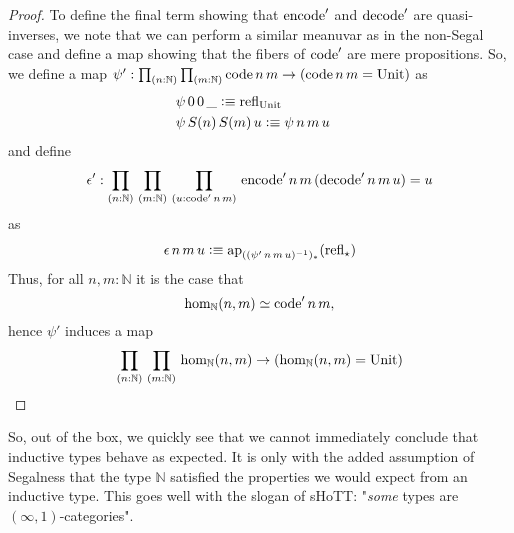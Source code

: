 \documentclass[main.tex]{subfiles}
\begin{document}
\begin{proof}
    To define the final term showing that $\eco'$ and $\dco'$ are quasi-inverses, we note that we can perform a similar
    meanuvar as in the non-Segal case and define a map showing that the fibers of $\co'$ are mere propositions. So, we define a map
     $\psi' : \prd{n : \mathbb{N}}{m : \mathbb{N}}\co\,n\,m \to (\co\,n\,m = \Un)$ as
    \begin{align*}
        &\psi\,0\,0\,\_\defeq \refl{\Un}\\
        &\psi\,S(n)\,S(m)\,u\defeq\psi\,n\,m\,u&
    \end{align*}
    and define 
$$\epsilon' : \prd{n:\mathbb{N}}{m:\mathbb{N}}{u : \co' \, n\, m}\eco'\,n\,m\,(\dco'\,n\,m \,u) =u$$
as
\begin{align*}
    \epsilon\,n\,m\,u \defeq \text{ap}_{((\psi'\,n\,m\,u)^{-1})_*}(\refl{\star})
\end{align*}
    Thus, for all $n,m : \mathbb{N}$ it is the case that
    $$\ho[\mathbb{N}]{n}{m}\simeq \co'\,n\,m,$$ hence $\psi'$ induces a map
    $$\prd{n : \mathbb{N}}{m : \mathbb{N}}\ho[\mathbb{N}]{n}{m} \to (\ho[\mathbb{N}]{n}{m} = \Un)$$
\end{proof}

So, out of the box, we quickly see that we cannot immediately conclude that inductive types behave as expected. It is only with
the added assumption of Segalness that the type $\mathbb{N}$ satisfied the properties we would expect from an inductive type.
This goes well with the slogan of sHoTT: "\textit{some} types are $(\infty,1)$-categories". 
\end{document}
